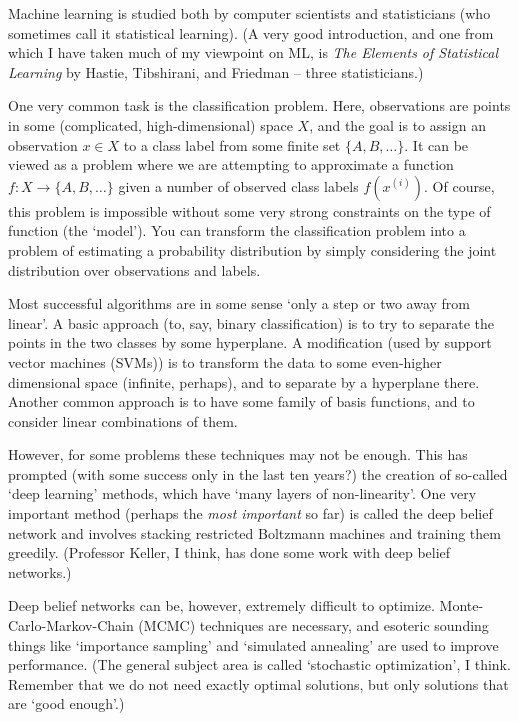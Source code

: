 \documentclass[12pt]{article}
\begin{document}
Machine learning is studied both by computer scientists and statisticians (who
sometimes call it statistical learning).  (A very good introduction, and one
from which I have taken much of my viewpoint on ML, is \textit{The Elements of
Statistical Learning} by Hastie, Tibshirani, and Friedman -- three
statisticians.)

One very common task is the classification problem.  Here, observations are
points in some (complicated, high-dimensional) space $X$, and the goal is to
assign an observation $x \in X$ to a class label from some finite set $\{A, B,
\ldots \}$.  It can be viewed as a problem where we are attempting to
approximate a function $f : X \to \{A, B, \ldots\}$ given a number of observed
class labels $f(x^{(i)})$.  Of course, this problem is impossible without some very
strong constraints on the type of function (the `model').  You can transform the
classification problem into a problem of estimating a probability distribution
by simply considering the joint distribution over observations and labels.

Most successful algorithms are in some sense `only a step or two away from
linear'.  A basic approach (to, say, binary classification) is to try to
separate the points in the two classes by some hyperplane.  A modification (used
by support vector machines (SVMs)) is to transform the data to some even-higher
dimensional space (infinite, perhaps), and to separate by a hyperplane there.
Another common approach is to have some family of basis functions, and to
consider linear combinations of them.

However, for some problems these techniques may not be enough.  This has
prompted (with some success only in the last ten years?) the creation of
so-called `deep learning' methods, which have `many layers of non-linearity'.
One very important method (perhaps the \emph{most important} so far) is called
the deep belief network and involves stacking restricted Boltzmann machines and
training them greedily.  (Professor Keller, I think, has done some work with
deep belief networks.)  

Deep belief networks can be, however, extremely difficult to optimize.
Monte-Carlo-Markov-Chain (MCMC) techniques are necessary, and esoteric sounding
things like `importance sampling' and `simulated annealing' are used to improve
performance.  (The general subject area is called `stochastic optimization', I
think.  Remember that we do not need exactly optimal solutions, but only
solutions that are `good enough'.)
\end{document}
